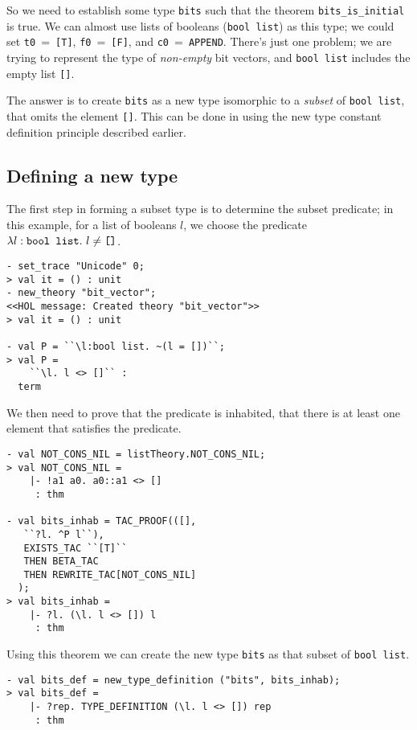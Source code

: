 So we need to establish some type \texttt{bits} such that the theorem
\texttt{bits\_is\_initial} is true.  We can almost use lists of booleans
(\texttt{bool list}) as this type;
we could set \texttt{t0}~=~\texttt{[T]}, \texttt{f0}~=~\texttt{[F]},
and \texttt{c0}~=~\texttt{APPEND}.
There's just one problem; we are trying to represent the type of
{\it non-empty\/} bit vectors, and \texttt{bool list} includes the empty list
\texttt{[]}.

The answer is to create \texttt{bits} as a new type isomorphic to a
{\it subset\/} of \texttt{bool list}, that omits the element \texttt{[]}.
This can be done in \HOLW{} using the new type constant definition principle
described earlier.

\subsection{Defining a new type}

The first step in forming a subset type
is to determine the subset predicate; in this example, for a list of booleans
$l$, we choose the predicate
$\lambda l:\mbox{\tt bool list}.\ l \neq \mbox{\tt []}$.
%
\setcounter{sessioncount}{0}
\begin{session}
\begin{verbatim}
- set_trace "Unicode" 0;
> val it = () : unit
- new_theory "bit_vector";
<<HOL message: Created theory "bit_vector">>
> val it = () : unit

- val P = ``\l:bool list. ~(l = [])``;
> val P =
    ``\l. l <> []`` :
  term
\end{verbatim}
\end{session}

We then need to prove that the predicate is inhabited, that there is at least one element
that satisfies the predicate.
%
\begin{session}
\begin{verbatim}
- val NOT_CONS_NIL = listTheory.NOT_CONS_NIL;
> val NOT_CONS_NIL =
    |- !a1 a0. a0::a1 <> []
     : thm

- val bits_inhab = TAC_PROOF(([],
   ``?l. ^P l``),
   EXISTS_TAC ``[T]``
   THEN BETA_TAC
   THEN REWRITE_TAC[NOT_CONS_NIL]
  );
> val bits_inhab =
    |- ?l. (\l. l <> []) l
     : thm
\end{verbatim}
\end{session}

Using this theorem we can create the new type \texttt{bits} as that subset of
\texttt{bool list}.
\begin{session}
\begin{verbatim}
- val bits_def = new_type_definition ("bits", bits_inhab);
> val bits_def =
    |- ?rep. TYPE_DEFINITION (\l. l <> []) rep
     : thm
\end{verbatim}
\end{session}

